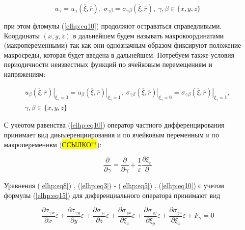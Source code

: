 \begin{equation}
    \label{elhp:eq13}
    u_{\gamma} =
    u_{\gamma}
    \left( \overline{\xi}, \overline{r} \right) 
    ,\;
    \sigma_{\gamma\beta} = 
    \sigma_{\gamma\beta}
    \left( \overline{\xi}, \overline{r} \right) 
    ,\;
    \gamma,\beta \in \{x,y,z\} 
\end{equation}

при этом фломулы 
(\ref{elhp:eq10})
продолжют остраваться справедливыми. Координаты 
$ \left( x,y,z \right) $ 
в дальнейшем будем называть макрокоординатами (макропеременными)
так как они однозначным образом фиксируют положение макросреды, которая будет введена в дальнейшем. Потребуем также условия периодичности неизвестных
функций по ячейковым перемещениям и напряжениям:

\begin{equation}
    \label{elhp:eq14}
    \begin{gathered}
    u_{\beta} \left. \left( \overline{\xi}, \overline{r} \right)  \right|_{\xi_{\gamma}=0} =
    u_{\beta} \left. \left( \overline{\xi}, \overline{r} \right)  \right|_{\xi_{\gamma}=1} 
    ,\;
    \sigma_{\gamma\beta} \left. \left( \overline{\xi}, \overline{r} \right)  \right|_{\xi_{\gamma}=0} =
    \sigma_{\gamma\beta} \left. \left( \overline{\xi}, \overline{r} \right)  \right|_{\xi_{\gamma}=1} 
    ,
    \\
    \gamma,\beta \in \{x,y,z\} 
    \end{gathered}
\end{equation}

С учеотом равенства 
(\ref{elhp:eq10})
оператор частного дифференцирования принимает вид диыыеренциирования и по ячейковым переменным и по макропеременнвм (\colorbox{yellow}{ССЫЛКО!!!}):

\begin{equation}
    \label{elhp:eq15}
    \frac{\partial }{\partial \gamma} = \frac{\partial }{\partial \gamma} + \frac{1}{\varepsilon} \frac{\partial \xi_{\varepsilon}}{\partial } 
\end{equation}

Уравнения 
(\ref{elhp:eq8})
, 
(\ref{elhp:eq3})
-
(\ref{elhp:eq5})
, 
(\ref{elhp:eq10})
с учетом формулы 
(\ref{elhp:eq15})
для диференциального оператора принимают вид

\begin{equation}
    \label{elhp:eq16}
    \frac{\partial \sigma_{\gamma x}}{\partial x} \varepsilon + 
    \frac{\partial \sigma_{\gamma y}}{\partial y} \varepsilon + 
    \frac{\partial \sigma_{\gamma z}}{\partial z} \varepsilon + 
    \frac{\partial \sigma_{\gamma x}}{\partial \xi_x} \varepsilon + 
    \frac{\partial \sigma_{\gamma y}}{\partial \xi_y} \varepsilon + 
    \frac{\partial \sigma_{\gamma z}}{\partial \xi_z} \varepsilon + 
    F_{\gamma} = 0
\end{equation}

